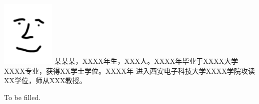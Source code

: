 

\begin{cauthorbio}{\includegraphics[height=1.25in]{photo}}
  某某某，XXXX年生，XXX人。XXXX年毕业于XXXX大学XXXX专业，获得XX学士学位。XXXX年
  进入西安电子科技大学XXXX学院攻读XX学位，师从XXX教授。
\end{cauthorbio}

\begin{eauthorbio}
  To be filled.
\end{eauthorbio}

